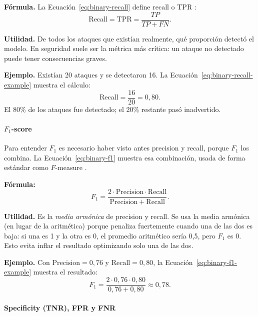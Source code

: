 \documentclass[12pt,oneside]{report}
\begin{document}
\textbf{Fórmula.} La Ecuación~\eqref{eq:binary-recall} define recall o TPR \cite{sokolova_lapalme_2009,powers2011}:
\begin{equation}
\label{eq:binary-recall}
\mathrm{Recall}=\mathrm{TPR}=\frac{TP}{TP+FN}.
\end{equation}

\textbf{Utilidad.} De todos los ataques que existían realmente, qué
proporción detectó el modelo. En seguridad suele ser la métrica más
crítica: un ataque no detectado puede tener consecuencias graves.

\textbf{Ejemplo.} Existían 20 ataques y se detectaron 16. La Ecuación~\eqref{eq:binary-recall-example} muestra el cálculo:
\begin{equation}
\label{eq:binary-recall-example}
\mathrm{Recall}=\frac{16}{20}=0{,}80.
\end{equation}
El 80\% de los ataques fue detectado; el 20\% restante pasó inadvertido.

\paragraph{$F_1$-score}

Para entender $F_1$ es necesario haber visto antes precision y recall,
porque $F_1$ los combina. La Ecuación~\eqref{eq:binary-f1} muestra esa combinación, usada de forma estándar como $F$-measure \cite{powers2011}.

\textbf{Fórmula:}
\begin{equation}
\label{eq:binary-f1}
F_1=\frac{2\cdot \mathrm{Precision}\cdot \mathrm{Recall}}{\mathrm{Precision}+\mathrm{Recall}}.
\end{equation}

\textbf{Utilidad.} Es la \emph{media armónica} de precision y recall. Se
usa la media armónica (en lugar de la aritmética) porque penaliza
fuertemente cuando una de las dos es baja: si una es 1 y la otra es 0,
el promedio aritmético sería 0{,}5, pero $F_1$ es 0. Esto evita inflar
el resultado optimizando solo una de las dos.

\textbf{Ejemplo.} Con $\mathrm{Precision}=0{,}76$ y $\mathrm{Recall}=0{,}80$, la Ecuación~\eqref{eq:binary-f1-example} muestra el resultado:
\begin{equation}
\label{eq:binary-f1-example}
F_1=\frac{2\cdot 0{,}76\cdot 0{,}80}{0{,}76+0{,}80}\approx 0{,}78.
\end{equation}

\paragraph{Specificity (TNR), FPR y FNR}
\end{document}
